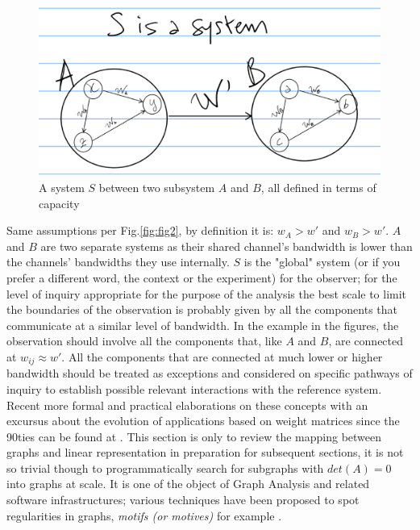 \documentclass[14pt,a4paper]{extarticle}
\begin{document}
\begin{figure}[htbp]
\begin{minipage}[t]{0.90\linewidth}
    \includegraphics[width=\linewidth]{Fig__3_a_system-2.eps}
	\caption{A system \(S\) between two subsystem \(A\) and \(B\), all defined in terms of capacity}%
	\label{fig:fig3}
\end{minipage}%
\end{figure}

Same assumptions per Fig.\ref{fig:fig2}, by definition it is: \(w_A > w'\)  and  \(w_B > w'\). \(A\) and \(B\) are two separate systems as their shared channel's bandwidth is lower than the channels' bandwidths they use internally. \(S\) is the "global" system (or if you prefer a different word, the context or the experiment) for the observer; for the level of inquiry appropriate for the purpose of the analysis the best scale to limit the boundaries of the observation is probably given by all the components that communicate at a similar level of bandwidth. In the example in the figures, the observation should involve all the components that, like \(A\) and \(B\), are connected at \(w_{ij} \approx w'\). All the components that are connected at much lower or higher bandwidth should be treated as exceptions and considered on specific pathways of inquiry to establish possible relevant interactions with the reference system.
\newline
Recent more formal and practical elaborations on these concepts with an excursus about the evolution of applications based on weight matrices since the 90ties can be found at \cite{KAZUKIselfrefweights}.
\newline
This section is only to review the mapping between graphs and linear representation in preparation for subsequent sections, it is not so trivial though to programmatically search for subgraphs with \(det(A) = 0\) into graphs at scale. It is one of the object of Graph Analysis and related software infrastructures; various techniques have been proposed to spot regularities in graphs, \textit{motifs (or motives)} for example \cite{schreiber2004towards}.
\end{document}
